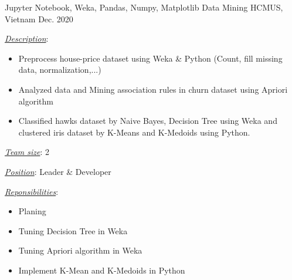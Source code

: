 \begin{cventries}
  \cventry
    {Jupyter Notebook, Weka, Pandas, Numpy, Matplotlib} %
    {Data Mining} %
    {HCMUS, Vietnam} %
    {Dec. 2020} %
    {
      \begin{cvitems} %
        \item \underline{\textit{Description}}:
        \begin{itemize}
          \item Preprocess house-price dataset using Weka \& Python (Count, fill missing data, normalization,...)
          \item Analyzed data and Mining association rules in churn dataset using Apriori algorithm
          \item Classified hawks dataset by Naive Bayes, Decision Tree using Weka and clustered iris dataset by K-Means and K-Medoids using Python.
        \end{itemize}
        \item \underline{\textit{Team size}}: 2
        \item \underline{\textit{Position}}: Leader \& Developer
        \item \underline{\textit{Reponsibilities}}: 
        \begin{itemize}
          \item Planing
          \item Tuning Decision Tree in Weka
          \item Tuning Apriori algorithm in Weka
          \item Implement K-Mean and K-Medoids in Python
        \end{itemize}
      \end{cvitems}
    }
\end{cventries}
